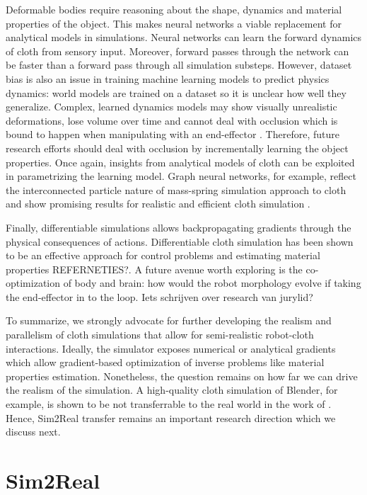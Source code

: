 \documentclass[\home/main.tex]{subfiles}
\begin{document}
Deformable bodies require reasoning about the shape, dynamics and material properties of the object. This makes neural networks a viable replacement for analytical models in simulations. Neural networks can learn the forward dynamics of cloth from sensory input. Moreover, forward passes through the network can be faster than a forward pass through all simulation substeps. 
However, dataset bias is also an issue in training machine learning models to predict physics dynamics: world models are trained on a dataset so it is unclear how well they generalize. Complex, learned dynamics models may show visually unrealistic deformations, lose volume over time and cannot deal with occlusion which is bound to happen when manipulating with an end-effector \autocite{Mrowca2018, Li2018}. Therefore, future research efforts should deal with occlusion by incrementally learning the object properties. 
Once again, insights from analytical models of cloth can be exploited in parametrizing the learning model. 
Graph neural networks, for example, reflect the interconnected particle nature of mass-spring simulation approach to cloth and show promising results for realistic and efficient cloth simulation \autocite{pfaff2021learning}.
 
Finally, differentiable simulations allows backpropagating gradients through the physical consequences of actions. Differentiable cloth simulation has been shown to be an effective approach for control problems and estimating material properties REFERNETIES?.
A future avenue worth exploring is the co-optimization of body and brain: how would the robot morphology evolve if taking the end-effector in to the loop. Iets schrijven over research van jurylid? 

To summarize, we strongly advocate for further developing the realism and parallelism of cloth simulations that allow for semi-realistic robot-cloth interactions. Ideally, the simulator exposes numerical or analytical gradients which allow gradient-based optimization of inverse problems like material properties estimation. Nonetheless, the question remains on how far we can drive the realism of the simulation. A high-quality cloth simulation of Blender, for example, is shown to be not transferrable to the real world in the work of \autocite{Tanaka2018}. Hence, Sim2Real transfer remains an important research direction which we discuss next. 

\section{Sim2Real}
\end{document}
